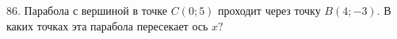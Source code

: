 86. Парабола с вершиной в точке $C(0;5)$ проходит через точку $B(4;-3).$ В каких точках эта парабола пересекает ось $x?$\\
